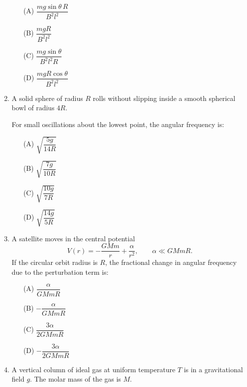 \documentclass[12pt]{article}
\begin{document}
\begin{enumerate}[leftmargin=0pt,itemindent=0pt]
\begin{center}
\end{center}

\begin{enumerate}
\item[(A)] $\dfrac{mg\sin\theta\,R}{B^2l^2}$
\item[(B)] $\dfrac{mgR}{B^2l^2}$
\item[(C)] $\dfrac{mg\sin\theta}{B^2l^2R}$
\item[(D)] $\dfrac{mgR\cos\theta}{B^2l^2}$
\end{enumerate}


\item A solid sphere of radius $R$ rolls without slipping inside a smooth spherical bowl of radius $4R$.

For small oscillations about the lowest point, the angular frequency is:

\begin{enumerate}
\item[(A)] $\sqrt{\dfrac{5g}{14R}}$
\item[(B)] $\sqrt{\dfrac{7g}{10R}}$
\item[(C)] $\sqrt{\dfrac{10g}{7R}}$
\item[(D)] $\sqrt{\dfrac{14g}{5R}}$
\end{enumerate}


\item A satellite moves in the central potential
\[
V(r) = -\frac{GMm}{r} + \frac{\alpha}{r^2}, \qquad \alpha \ll GMmR.
\]
If the circular orbit radius is $R$, the fractional change in angular frequency due to the perturbation term is:

\begin{enumerate}
\item[(A)] $\dfrac{\alpha}{GMmR}$
\item[(B)] $-\dfrac{\alpha}{GMmR}$
\item[(C)] $\dfrac{3\alpha}{2GMmR}$
\item[(D)] $-\dfrac{3\alpha}{2GMmR}$
\end{enumerate}


\item A vertical column of ideal gas at uniform temperature $T$ is in a gravitational field $g$. The molar mass of the gas is $M$.


\end{enumerate}
\end{document}
